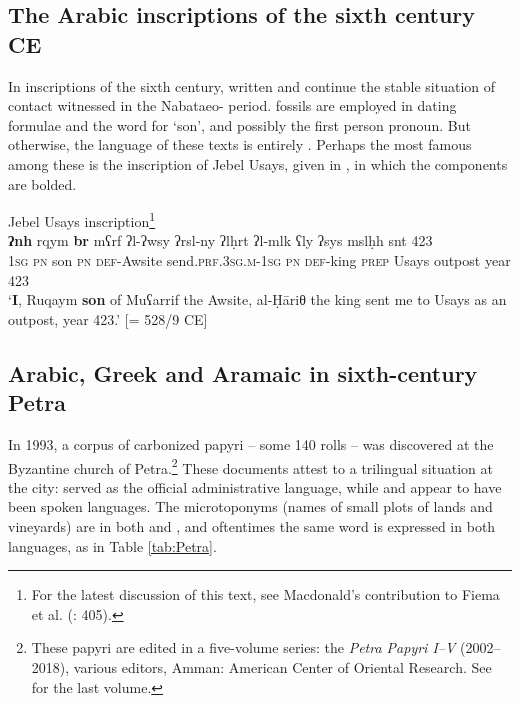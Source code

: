 \documentclass[output=paper]{langsci/langscibook}
\begin{document}
\subsection{The Arabic inscriptions of the sixth century CE}
In  inscriptions of the sixth century, written  and  continue the stable situation of contact witnessed in the Nabataeo- period.  fossils are employed in dating formulae and the word for ‘son’, and possibly the first person pronoun. But otherwise, the language of these texts is entirely . Perhaps the most famous among these is the inscription of Jebel Usays, given in , in which the  components are bolded.

\ea\label{Usays} Jebel Usays inscription\footnote{For the latest discussion of this text, see Macdonald’s contribution to Fiema et al. (\citeyear{Fiemaetal2015}: 405).}\\
\gll   \textbf{ʔnh}\footnotemark{} rqym \textbf{br} mʕrf ʔl-ʔwsy ʔrsl-ny ʔlḥrt ʔl-mlk ʕly ʔsys mslḥh snt 423 \\
       \textsc{1sg} \textsc{pn} son \textsc{pn} \textsc{def}-Awsite send.\textsc{prf.3sg.m-1sg} \textsc{pn} \textsc{def}-king \textsc{prep} Usays outpost year 423  \\
\glt   `\textbf{I}, Ruqaym \textbf{son} of Muʕarrif the Awsite, al-Ḥāriθ the king sent me to Usays as an outpost, year 423.' [= 528/9 CE]
\z


\subsection{Arabic, Greek and Aramaic in sixth-century Petra}
In 1993, a corpus of carbonized  papyri – some 140 rolls – was discovered at the Byzantine church of Petra.\footnote{These papyri are edited in a five-volume series: the \textit{Petra Papyri I--V} (2002--2018), various editors, Amman: American Center of Oriental
Research. See \citet{Arjavaetal2018} for the last volume.} These documents attest to a trilingual situation at the city:  served as the official administrative language, while  and  appear to have been spoken languages. The microtoponyms (names of small plots of lands and vineyards) are in both  and , and oftentimes the same word is expressed in both languages, as in Table \ref{tab:Petra}. 
\end{document}
